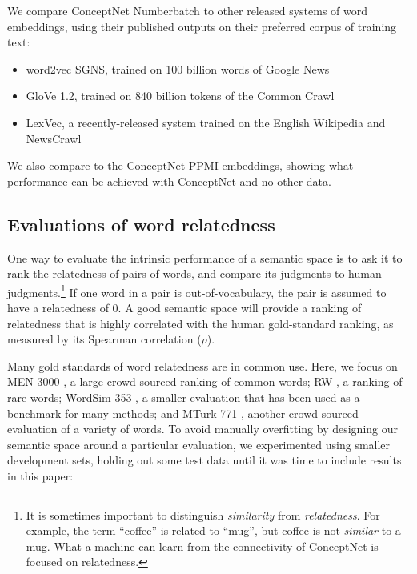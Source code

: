 \documentclass[letterpaper]{article}
\begin{document}
We compare ConceptNet Numberbatch to other released systems of word embeddings,
using their published outputs on their preferred corpus of training text:

\begin{itemize}
    \item word2vec SGNS, trained on 100 billion words of Google News \cite{mikolov2013word2vec}
    \item GloVe 1.2, trained on 840 billion tokens of the Common Crawl \cite{pennington2014glove}
    \item LexVec, a recently-released system trained on the English Wikipedia and NewsCrawl \cite{salle2016lexvec}
\end{itemize}

We also compare to the ConceptNet PPMI embeddings, showing what performance
can be achieved with ConceptNet and no other data.

\subsection{Evaluations of word relatedness}
\label{intrinsic-evaluations}

One way to evaluate the intrinsic performance of a semantic space is to ask it
to rank the relatedness of pairs of words, and compare its judgments to human
judgments.\footnote{It is sometimes important to distinguish \emph{similarity}
from \emph{relatedness}. For example, the term ``coffee'' is related to
``mug'', but coffee is not \emph{similar} to a mug. What a machine can learn
from the connectivity of ConceptNet is focused on relatedness.} If one word in
a pair is out-of-vocabulary, the pair is assumed to have a relatedness of 0. A
good semantic space will provide a ranking of relatedness that is highly
correlated with the human gold-standard ranking, as measured by its Spearman
correlation ($\rho$).

Many gold standards of word relatedness are in common use. Here, we focus on
MEN-3000 \cite{bruni2014men}, a large crowd-sourced ranking of common words; RW
\cite{luong2013rw}, a ranking of rare words; WordSim-353 \cite{finkelstein2001ws},
a smaller evaluation that has been used as a benchmark for many methods; and MTurk-771
\cite{halawi2012mturk}, another crowd-sourced evaluation of a variety of words.
To avoid manually overfitting by designing our semantic space around a
particular evaluation, we experimented using smaller development sets, holding
out some test data until it was time to include results in this paper:
\end{document}
